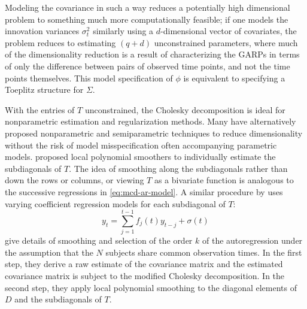 \bigskip

Modeling the covariance in such a way reduces a potentially high dimensional problem to something much more computationally feasible; if one models the innovation variances $\sigma_t^2$ similarly using a $d$-dimensional vector of covariates, the problem reduces to estimating $\left(q+d\right)$ unconstrained parameters, where much of the dimensionality reduction is a result of characterizing the GARPs in terms of only the difference between pairs of observed time points, and not the time points themselves.  This model specification of $\phi$ is equivalent to specifying a Toeplitz structure for $\Sigma$.
\bigskip

With the entries of $T$ unconstrained, the Cholesky decomposition is ideal for nonparametric estimation and regularization methods. Many have alternatively proposed nonparametric and semiparametric techniques  to reduce dimensionality without the risk of model misspecification often accompanying parametric models.  \cite{wu2003nonparametric} proposed local polynomial smoothers to individually estimate the subdiagonals of $T$. The idea of smoothing along the subdiagonals rather than down the rows or columns, or viewing $T$ as a bivariate function is analogous to the successive regressions in \eqref{eq:mcd-ar-model}. A similar procedure by \cite{dahlhaus1997fitting} uses varying coefficient regression models for each subdiagonal of $T$:
\begin{equation} \label{eq:one-dimensional-mcd-vc-model}
y_t = \sum_{j = 1}^{t-1} f_{j}\left( t \right) y_{t-j} + \sigma\left(t\right)
\end{equation}
\cite{wu2003nonparametric} give details of smoothing and selection of the order $k$ of the autoregression under the assumption that the $N$ subjects share common observation times.  In the first step, they derive a raw estimate of the covariance matrix and the estimated covariance matrix is subject to the modified Cholesky decomposition. In the second step, they apply local polynomial smoothing to the diagonal elements of $D$ and the subdiagonals of $T$.  

\bigskip

